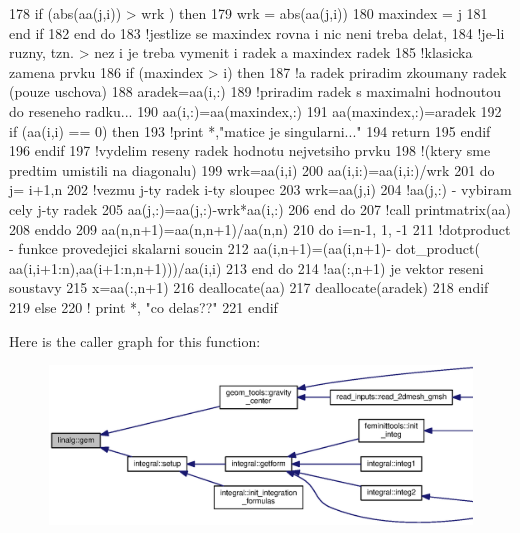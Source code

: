 \begin{DoxyCode}
178             \textcolor{keywordflow}{if} (abs(aa(j,i)) > wrk ) then
179               wrk = abs(aa(j,i))
180               maxindex  = j
181 \textcolor{keyword}{            end }if
182 \textcolor{keyword}{          end }do
183           \textcolor{comment}{!jestlize se maxindex rovna i nic neni treba delat,
}
184           \textcolor{comment}{!je-li ruzny, tzn. > nez i je treba vymenit i radek a maxindex radek
}
185           \textcolor{comment}{!klasicka zamena prvku
}
186           \textcolor{keywordflow}{if} (maxindex > i) then
187             \textcolor{comment}{!a radek priradim zkoumany radek (pouze uschova)
}
188             aradek=aa(i,:)
189             \textcolor{comment}{!priradim radek s maximalni hodnoutou do reseneho radku...
}
190             aa(i,:)=aa(maxindex,:)   
191             aa(maxindex,:)=aradek
192             \textcolor{keywordflow}{if} (aa(i,i) == 0) then
193               \textcolor{comment}{!print *,"matice je singularni..."
}
194               return
195 \textcolor{keyword}{            end}if
196 \textcolor{keyword}{          end}if
197           \textcolor{comment}{!vydelim reseny radek hodnotu nejvetsiho prvku 
}
198           \textcolor{comment}{!(ktery sme predtim umistili na diagonalu)
}
199           wrk=aa(i,i)
200           aa(i,i:)=aa(i,i:)/wrk
201           \textcolor{keywordflow}{do} j= i+1,n
202             \textcolor{comment}{!vezmu j-ty radek i-ty sloupec
}
203             wrk=aa(j,i)
204             \textcolor{comment}{!aa(j,:) - vybiram cely j-ty radek
}
205             aa(j,:)=aa(j,:)-wrk*aa(i,:)
206 \textcolor{keyword}{          end }do
207           \textcolor{comment}{!call printmatrix(aa)
}
208 \textcolor{keyword}{        end}do
209         aa(n,n+1)=aa(n,n+1)/aa(n,n)
210         \textcolor{keywordflow}{do} i=n-1, 1, -1
211           \textcolor{comment}{!dotproduct - funkce provedejici skalarni soucin
}
212           aa(i,n+1)=(aa(i,n+1)- dot\_product( aa(i,i+1:n),aa(i+1:n,n+1)))/aa(i,i)
213 \textcolor{keyword}{        end }do
214         \textcolor{comment}{!aa(:,n+1) je vektor reseni soustavy
}
215         x=aa(:,n+1)
216         \textcolor{keyword}{deallocate}(aa) 
217         \textcolor{keyword}{deallocate}(aradek)
218 \textcolor{keyword}{      end}if
219     else
220       \textcolor{comment}{! print *, "co delas??"
}
221 \textcolor{keyword}{    end}if
\end{DoxyCode}


Here is the caller graph for this function\+:\nopagebreak
\begin{figure}[H]
\begin{center}
\leavevmode
\includegraphics[width=350pt]{namespacelinalg_a59ec4fd454fde0117c42b153537f53fd_icgraph}
\end{center}
\end{figure}


